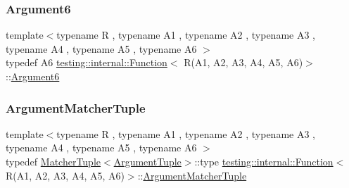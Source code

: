 \subsubsection{\texorpdfstring{Argument6}{Argument6}}
{\footnotesize\ttfamily template$<$typename R , typename A1 , typename A2 , typename A3 , typename A4 , typename A5 , typename A6 $>$ \\
typedef A6 \mbox{\hyperlink{structtesting_1_1internal_1_1_function}{testing\+::internal\+::\+Function}}$<$ R(A1, A2, A3, A4, A5, A6)$>$\+::\mbox{\hyperlink{structtesting_1_1internal_1_1_function_3_01_r_07_a1_00_01_a2_00_01_a3_00_01_a4_00_01_a5_00_01_a6_08_4_ab69a06609b76f3b0ef780b9ecf0a940c}{Argument6}}}

\mbox{\label{structtesting_1_1internal_1_1_function_3_01_r_07_a1_00_01_a2_00_01_a3_00_01_a4_00_01_a5_00_01_a6_08_4_a8555cb8e68c1e64b91b6c50a7b5951bd}} 
\subsubsection{\texorpdfstring{ArgumentMatcherTuple}{ArgumentMatcherTuple}}
{\footnotesize\ttfamily template$<$typename R , typename A1 , typename A2 , typename A3 , typename A4 , typename A5 , typename A6 $>$ \\
typedef \mbox{\hyperlink{structtesting_1_1internal_1_1_matcher_tuple}{Matcher\+Tuple}}$<$\mbox{\hyperlink{structtesting_1_1internal_1_1_function_3_01_r_07_08_4_ad483c3128c470d8cdb55c3ac1c575c11}{Argument\+Tuple}}$>$\+::type \mbox{\hyperlink{structtesting_1_1internal_1_1_function}{testing\+::internal\+::\+Function}}$<$ R(A1, A2, A3, A4, A5, A6)$>$\+::\mbox{\hyperlink{structtesting_1_1internal_1_1_function_3_01_r_07_08_4_a9bec5cf8937e8af99dedab2f40129fab}{Argument\+Matcher\+Tuple}}}

\mbox{\label{structtesting_1_1internal_1_1_function_3_01_r_07_a1_00_01_a2_00_01_a3_00_01_a4_00_01_a5_00_01_a6_08_4_a3120b03652156e1475ce5892e1b5dd7a}} 
